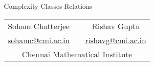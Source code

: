 \documentclass{article}
\begin{document}
\hspace{0pt}
\vfill
\begin{center}
    \Huge{Complexity Classes Relations}
    
    \vspace*{1cm}
    \begin{tabular}{ccc}
    \LARGE{Soham Chatterjee} &\hspace*{2cm}& \LARGE{Rishav Gupta}\\[-4mm]
    \Large{\url{sohamc@cmi.ac.in}} &\hspace*{2cm}& \Large{\url{rishavg@cmi.ac.in}}\\[5mm]
     \multicolumn{3}{c}{\LARGE{Chennai Mathematical Institute}} 
    \end{tabular}
\end{center}	
\vfill
\hspace{0pt}


\pagebreak

\tableofcontents




\end{document}
